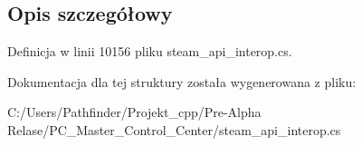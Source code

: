 \subsection{Opis szczegółowy}


Definicja w linii 10156 pliku steam\+\_\+api\+\_\+interop.\+cs.



Dokumentacja dla tej struktury została wygenerowana z pliku\+:\begin{DoxyCompactItemize}
\item 
C\+:/\+Users/\+Pathfinder/\+Projekt\+\_\+cpp/\+Pre-\/\+Alpha Relase/\+P\+C\+\_\+\+Master\+\_\+\+Control\+\_\+\+Center/steam\+\_\+api\+\_\+interop.\+cs\end{DoxyCompactItemize}
